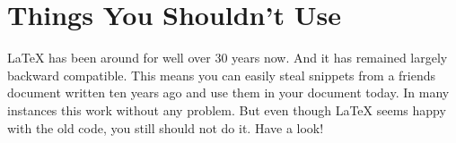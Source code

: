 \chapter{Things You Shouldn't Use}

\begin{intro}
  \LaTeX{} has been around for well over 30 years now. And it has remained
  largely backward compatible. This means you can easily steal snippets from
  a friends document written ten years ago and use them in your document today.
  In many instances this work without any problem. But even though \LaTeX{} seems happy
  with the old code, you still should not do it. Have a look!
\end{intro}

\begingroup
\ExplSyntaxOn
{}


